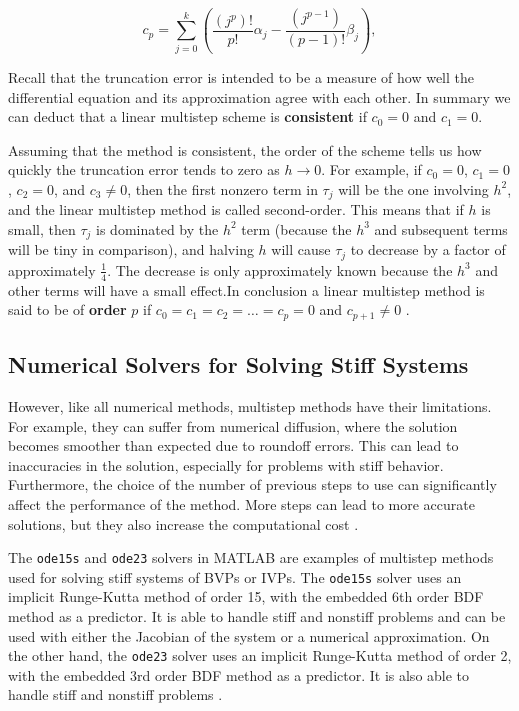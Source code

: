 \begin{equation}
  c_p = \sum_{j=0}^{k} \left( \frac{(j^p)!}{p!} \alpha_j - \frac{(j^{p-1})}{(p-1)!} \beta_j \right),
\end{equation}

Recall that the truncation error is intended to be a measure of how well the differential equation and its approximation agree with each other\cite{HELM2008NumericalIVP}. In summary we can deduct that a linear multistep scheme is \textbf{consistent} if $c_0 = 0$ and $c_1 = 0$.


Assuming that the method is consistent, the order of the scheme tells us how quickly the truncation error tends to zero as $h \rightarrow 0$. For example, if $c_0 = 0$, $c_1 = 0$, $c_2 = 0$, and $c_3 \neq 0$, then the first nonzero term in $\tau_j$ will be the one involving $h^2$, and the linear multistep method is called second-order. This means that if $h$ is small, then $\tau_j$ is dominated by the $h^2$ term (because the $h^3$ and subsequent terms will be tiny in comparison), and halving $h$ will cause $\tau_j$ to decrease by a factor of approximately $\frac{1}{4}$. The decrease is only approximately known because the $h^3$ and other terms will have a small effect.In conclusion a linear multistep method is said to be of \textbf{order} $p$ if $c_0 = c_1 = c_2 = \ldots = c_p = 0$ and $c_{p+1} \neq 0$ \cite{HELM2008NumericalIVP}.




\subsection*{Numerical Solvers for Solving Stiff Systems}

However, like all numerical methods, multistep methods have their limitations. For example, they can suffer from numerical diffusion, where the solution becomes smoother than expected due to roundoff errors. This can lead to inaccuracies in the solution, especially for problems with stiff behavior. Furthermore, the choice of the number of previous steps to use can significantly affect the performance of the method. More steps can lead to more accurate solutions, but they also increase the computational cost \cite{math7121158}.

The \texttt{ode15s} and \texttt{ode23} solvers in MATLAB are examples of multistep methods used for solving stiff systems of BVPs or IVPs. The \texttt{ode15s} solver uses an implicit Runge-Kutta method of order 15, with the embedded 6th order BDF method as a predictor. It is able to handle stiff and nonstiff problems and can be used with either the Jacobian of the system or a numerical approximation. On the other hand, the \texttt{ode23} solver uses an implicit Runge-Kutta method of order 2, with the embedded 3rd order BDF method as a predictor. It is also able to handle stiff and nonstiff problems \cite{wong2020lecture}.

